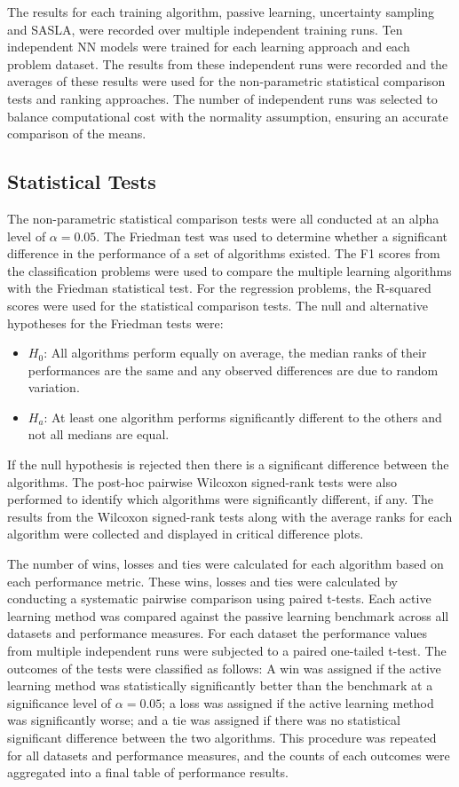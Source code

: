\documentclass[conference]{IEEEtran}
\begin{document}
	The results for each training algorithm, passive learning, uncertainty sampling and SASLA, were recorded over multiple independent training runs. Ten independent NN models were trained for each learning approach and each problem dataset. The results from these independent runs were recorded and the averages of these results were used for the non-parametric statistical comparison tests and ranking approaches. The number of independent runs was selected to balance computational cost with the normality assumption, ensuring an accurate comparison of the means.
	
	\subsection{Statistical Tests}
	The non-parametric statistical comparison tests were all conducted at an alpha level of $\alpha=0.05$. The Friedman test was used to determine whether a significant difference in the performance of a set of algorithms existed. The F1 scores from the classification problems were used to compare the multiple learning algorithms with the Friedman statistical test. For the regression problems, the R-squared scores were used for the statistical comparison tests. The null and alternative hypotheses for the Friedman tests were:
	\begin{itemize}
		\item $H_0$: All algorithms perform equally on average, the median ranks of their performances are the same and any observed differences are due to random variation.
		\item $H_a$: At least one algorithm performs significantly different to the others and not all medians are equal.
	\end{itemize}
	If the null hypothesis is rejected then there is a significant difference between the algorithms. The post-hoc pairwise Wilcoxon signed-rank tests were also performed to identify which algorithms were significantly different, if any. The results from the Wilcoxon signed-rank tests along with the average ranks for each algorithm were collected and displayed in critical difference plots.
	
	The number of wins, losses and ties were calculated for each algorithm based on each performance metric. These wins, losses and ties were calculated by conducting a systematic pairwise comparison using paired t-tests. Each active learning method was compared against the passive learning benchmark across all datasets and performance measures. For each dataset the performance values from multiple independent runs were subjected to a paired one-tailed t-test. The outcomes of the tests were classified as follows: A win was assigned if the active learning method was statistically significantly better than the benchmark at a significance level of $\alpha=0.05$; a loss was assigned if the active learning method was significantly worse; and a tie was assigned if there was no statistical significant difference between the two algorithms. This procedure was repeated for all datasets and performance measures, and the counts of each outcomes were aggregated into a final table of performance results.
	
\end{document}
